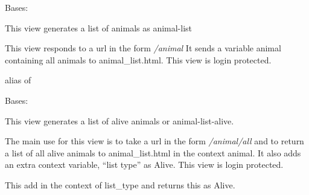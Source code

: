 \documentclass[letterpaper,10pt,english]{sphinxmanual}
\begin{document}

\begin{fulllineitems}
\label{api:mousedb.animal.views.AnimalList}
Bases: {\hyperref[api:mousedb.views.ProtectedListView]{}}

This view generates a list of animals as animal-list

This view responds to a url in the form \emph{/animal}
It sends a variable animal containing all animals to animal\_list.html.
This view is login protected.


\begin{fulllineitems}
\label{api:mousedb.animal.views.AnimalList.model}
alias of 

\end{fulllineitems}


\end{fulllineitems}



\begin{fulllineitems}
\label{api:mousedb.animal.views.AnimalListAlive}
Bases: {\hyperref[api:mousedb.animal.views.AnimalList]{}}

This view generates a list of alive animals or animal-list-alive.

The main use for this view is to take a url in the form \emph{/animal/all} and to return a list of all alive animals to animal\_list.html in the context animal.  It also adds an extra context variable, ``list type'' as Alive.  
This view is login protected.


\begin{fulllineitems}
\label{api:mousedb.animal.views.AnimalListAlive.get_context_data}
This add in the context of list\_type and returns this as Alive.

\end{fulllineitems}


\end{fulllineitems}
\end{document}
